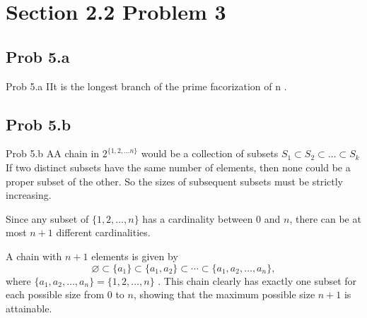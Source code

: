\documentclass{report}
\begin{document}
\section*{Section 2.2 Problem 3}


\subsection*{Prob 5.a}

\begin{RemarkWithLily}{Prob 5.a }
  IIt is the longest branch of the prime facorization of n . 
\end{RemarkWithLily}

\subsection*{Prob 5.b}

\begin{RemarkWithLily}{Prob 5.b}
  AA chain in $2^{\{1, 2, \ldots n\}}$ would be a collection of subsets $S_{1} \subset S_{2} \subset \ldots \subset  S_{k}$
  If two distinct subsets have the same number of elements, then none could be a proper subset of the other. So the sizes of subsequent subsets must be strictly increasing.  

  \bigskip 
  Since any subset of \(\{1,2,\dots,n\}\) has a cardinality between \(0\) and \(n\), there can be at most \(n+1\) different cardinalities. 
  
  \bigskip
    
  A chain with \(n+1\) elements is given by
  \[
  \varnothing \subset \{a_1\} \subset \{a_1, a_2\} \subset \cdots \subset \{a_1, a_2, \dots, a_n\},
  \]
  where \(\{a_1, a_2, \dots, a_n\} = \{1,2,\dots,n\}\) . This chain clearly has exactly one subset for each possible size from \(0\) to \(n\), showing that the maximum possible size \(n+1\) is attainable.
  
  \bigskip
\end{RemarkWithLily}
\end{document}
